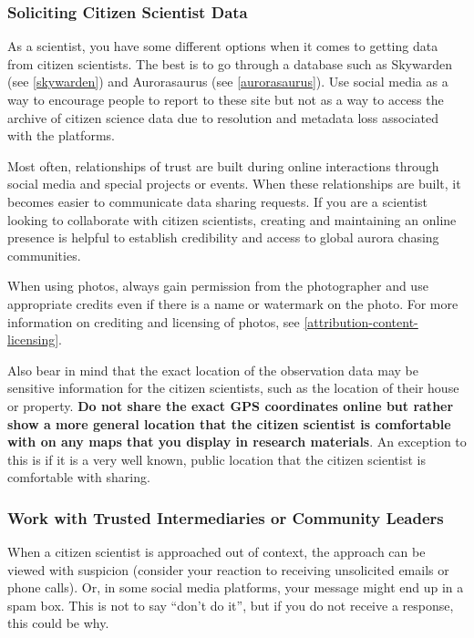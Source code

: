 \documentclass{article}
\newcommand{\contributed}[1]{%
    \par\noindent
    \begingroup
    \setlength{\leftskip}{1em}%
    \itshape
    Contributors: #1
    \par
    \endgroup
    \vspace{0.5em}
}
\begin{document}
\subsubsection{Soliciting Citizen Scientist Data}

As a scientist, you have some different options when it comes to getting data from citizen scientists. The best is to go through a database such as Skywarden (see \ref{skywarden}) and Aurorasaurus (see  \ref{aurorasaurus}).
Use social media as a way to encourage people to report to these site but not as a way to access the archive of citizen science data due to resolution and metadata loss associated with the platforms. 

Most often, relationships of trust are built during online interactions through social media and special projects or events.  When these relationships are built, it becomes easier to communicate data sharing requests.  If you are a scientist looking to collaborate with citizen scientists, creating and maintaining an online presence is helpful to establish credibility and access to global aurora chasing communities.

When using photos, always gain permission from the photographer and use appropriate credits even if there is a name or watermark on the photo. For more information on crediting and licensing of photos, see \ref{attribution-content-licensing}.

Also bear in mind that the exact location of the observation data may be sensitive information for the citizen scientists, such as the location of their house or property. \textbf{Do not share the exact GPS coordinates online but rather show a more general location that the citizen scientist is comfortable with on any maps that you display in research materials}. An exception to this is if it is a very well known, public location that the citizen scientist is comfortable with sharing.

\subsubsection{Work with Trusted Intermediaries or Community Leaders}
When a citizen scientist is approached out of context, the approach can be viewed with suspicion (consider your reaction to receiving unsolicited emails or phone calls). Or, in some social media platforms, your message might end up in a spam box. This is not to say ``don't do it'', but if you do not receive a response, this could be why.
\end{document}
